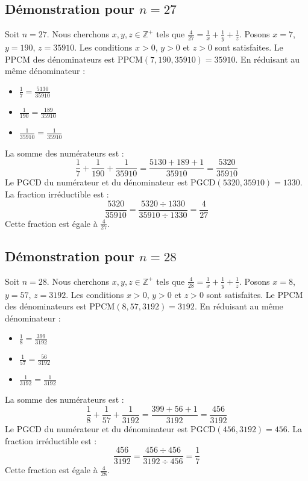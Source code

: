 \documentclass[11pt,a4paper]{article}
\begin{document}
\subsection{Démonstration pour $n = 27$}
Soit $n = 27$. Nous cherchons $x, y, z \in \mathbb{Z}^{+}$ tels que $\frac{4}{27} = \frac{1}{x} + \frac{1}{y} + \frac{1}{z}$.
Posons $x = 7$, $y = 190$, $z = 35910$.
Les conditions $x > 0$, $y > 0$ et $z > 0$ sont satisfaites.
Le PPCM des dénominateurs est $\text{PPCM}(7, 190, 35910) = 35910$.
En réduisant au même dénominateur :
\begin{itemize}
    \item $\frac{1}{7} = \frac{5130}{35910}$
    \item $\frac{1}{190} = \frac{189}{35910}$
    \item $\frac{1}{35910} = \frac{1}{35910}$
\end{itemize}
La somme des numérateurs est :
$$ \frac{1}{7} + \frac{1}{190} + \frac{1}{35910} = \frac{5130 + 189 + 1}{35910} = \frac{5320}{35910} $$
Le PGCD du numérateur et du dénominateur est $\text{PGCD}(5320, 35910) = 1330$.
La fraction irréductible est :
$$ \frac{5320}{35910} = \frac{5320 \div 1330}{35910 \div 1330} = \frac{4}{27} $$
Cette fraction est égale à $\frac{4}{27}$.

\subsection{Démonstration pour $n = 28$}
Soit $n = 28$. Nous cherchons $x, y, z \in \mathbb{Z}^{+}$ tels que $\frac{4}{28} = \frac{1}{x} + \frac{1}{y} + \frac{1}{z}$.
Posons $x = 8$, $y = 57$, $z = 3192$.
Les conditions $x > 0$, $y > 0$ et $z > 0$ sont satisfaites.
Le PPCM des dénominateurs est $\text{PPCM}(8, 57, 3192) = 3192$.
En réduisant au même dénominateur :
\begin{itemize}
    \item $\frac{1}{8} = \frac{399}{3192}$
    \item $\frac{1}{57} = \frac{56}{3192}$
    \item $\frac{1}{3192} = \frac{1}{3192}$
\end{itemize}
La somme des numérateurs est :
$$ \frac{1}{8} + \frac{1}{57} + \frac{1}{3192} = \frac{399 + 56 + 1}{3192} = \frac{456}{3192} $$
Le PGCD du numérateur et du dénominateur est $\text{PGCD}(456, 3192) = 456$.
La fraction irréductible est :
$$ \frac{456}{3192} = \frac{456 \div 456}{3192 \div 456} = \frac{1}{7} $$
Cette fraction est égale à $\frac{4}{28}$.
\end{document}
